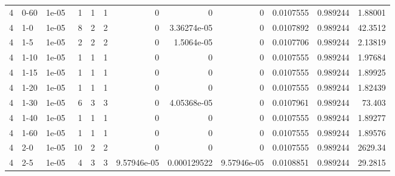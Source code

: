 \begin{tabular}{rlrrrrrrrrrr}
     4 & 0-60   &      1e-05 &           1 &                 1 &                 1 &     0           &     0           &      0           &        0.0107555 &               0.989244 &           1.88001  \\
     4 & 1-0    &      1e-05 &           8 &                 2 &                 2 &     0           &     3.36274e-05 &      0           &        0.0107892 &               0.989244 &          42.3512   \\
     4 & 1-5    &      1e-05 &           2 &                 2 &                 2 &     0           &     1.5064e-05  &      0           &        0.0107706 &               0.989244 &           2.13819  \\
     4 & 1-10   &      1e-05 &           1 &                 1 &                 1 &     0           &     0           &      0           &        0.0107555 &               0.989244 &           1.97684  \\
     4 & 1-15   &      1e-05 &           1 &                 1 &                 1 &     0           &     0           &      0           &        0.0107555 &               0.989244 &           1.89925  \\
     4 & 1-20   &      1e-05 &           1 &                 1 &                 1 &     0           &     0           &      0           &        0.0107555 &               0.989244 &           1.82439  \\
     4 & 1-30   &      1e-05 &           6 &                 3 &                 3 &     0           &     4.05368e-05 &      0           &        0.0107961 &               0.989244 &          73.403    \\
     4 & 1-40   &      1e-05 &           1 &                 1 &                 1 &     0           &     0           &      0           &        0.0107555 &               0.989244 &           1.89277  \\
     4 & 1-60   &      1e-05 &           1 &                 1 &                 1 &     0           &     0           &      0           &        0.0107555 &               0.989244 &           1.89576  \\
     4 & 2-0    &      1e-05 &          10 &                 2 &                 2 &     0           &     0           &      0           &        0.0107555 &               0.989244 &        2629.34     \\
     4 & 2-5    &      1e-05 &           4 &                 3 &                 3 &     9.57946e-05 &     0.000129522 &      9.57946e-05 &        0.0108851 &               0.989244 &          29.2815   \\

\end{tabular}
